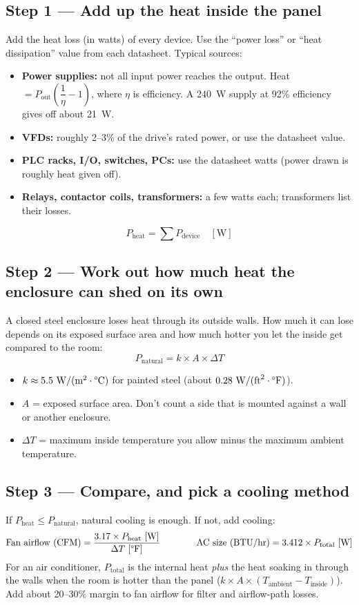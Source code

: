 \subsection*{Step 1 --- Add up the heat inside the panel}
Add the heat loss (in watts) of every device. Use the ``power loss'' or ``heat dissipation'' value from each datasheet. Typical sources:
\begin{itemize}[itemsep=1pt]
  \item \textbf{Power supplies:} not all input power reaches the output. Heat $= P_{\text{out}}\left(\dfrac{1}{\eta} - 1\right)$, where $\eta$ is efficiency. A 240~W supply at 92\% efficiency gives off about 21~W.
  \item \textbf{VFDs:} roughly 2--3\% of the drive's rated power, or use the datasheet value.
  \item \textbf{PLC racks, I/O, switches, PCs:} use the datasheet watts (power drawn is roughly heat given off).
  \item \textbf{Relays, contactor coils, transformers:} a few watts each; transformers list their losses.
\end{itemize}
\[
  P_{\text{heat}} = \sum P_{\text{device}} \quad [\text{W}]
\]

\subsection*{Step 2 --- Work out how much heat the enclosure can shed on its own}
A closed steel enclosure loses heat through its outside walls. How much it can lose depends on its exposed surface area and how much hotter you let the inside get compared to the room:
\[
  P_{\text{natural}} = k \times A \times \Delta T
\]
\begin{itemize}[itemsep=1pt]
  \item $k \approx 5.5~\text{W}/(\text{m}^2\cdot\text{\textdegree C})$ for painted steel (about $0.28~\text{W}/(\text{ft}^2\cdot\text{\textdegree F})$).
  \item $A$ = exposed surface area. Don't count a side that is mounted against a wall or another enclosure.
  \item $\Delta T$ = maximum inside temperature you allow minus the maximum ambient temperature.
\end{itemize}

\subsection*{Step 3 --- Compare, and pick a cooling method}
If $P_{\text{heat}} \leq P_{\text{natural}}$, natural cooling is enough. If not, add cooling:
\[
  \text{Fan airflow (CFM)} = \frac{3.17 \times P_{\text{heat}}~[\text{W}]}{\Delta T~[\text{\textdegree F}]}
  \qquad\qquad
  \text{AC size (BTU/hr)} = 3.412 \times P_{\text{total}}~[\text{W}]
\]
For an air conditioner, $P_{\text{total}}$ is the internal heat \emph{plus} the heat soaking in through the walls when the room is hotter than the panel ($k \times A \times (T_{\text{ambient}} - T_{\text{inside}})$). Add about 20--30\% margin to fan airflow for filter and airflow-path losses.

